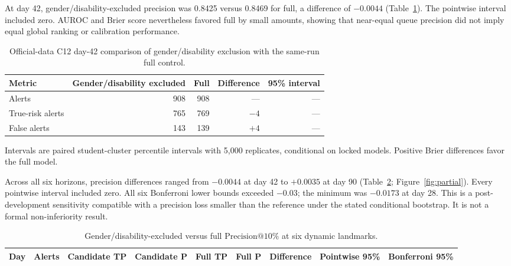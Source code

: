\documentclass[11pt]{article}
\makeatletter
\newcommand{\Pten}{\ensuremath{\mathrm{Precision}@10\%}}
\makeatother
\begin{document}
At day 42, gender/disability-excluded precision was 0.8425 versus 0.8469 for full, a difference of $-0.0044$ (Table~\ref{tab:day42}). The pointwise interval included zero. AUROC and Brier score nevertheless favored full by small amounts, showing that near-equal queue precision did not imply equal global ranking or calibration performance.

\begin{table}[htbp]
\centering
\caption{Official-data C12 day-42 comparison of gender/disability exclusion with the same-run full control.}
\label{tab:day42}
\begin{threeparttable}
\small
\begin{tabular}{lrrrr}
\toprule
Metric & Gender/disability excluded & Full & Difference & 95\% interval \\
\midrule
Alerts & 908 & 908 & --- & --- \\
True-risk alerts & 765 & 769 & $-4$ & --- \\
False alerts & 143 & 139 & $+4$ & --- \\

\end{tabular}
\begin{tablenotes}[flushleft]
\footnotesize
\item Intervals are paired student-cluster percentile intervals with 5,000 replicates, conditional on locked models. Positive Brier differences favor the full model.
\end{tablenotes}
\end{threeparttable}
\end{table}

Across all six horizons, precision differences ranged from $-0.0044$ at day 42 to $+0.0035$ at day 90 (Table~\ref{tab:landmarks}; Figure~\ref{fig:partial}). Every pointwise interval included zero. All six Bonferroni lower bounds exceeded $-0.03$; the minimum was $-0.0173$ at day 28. This is a post-development sensitivity compatible with a precision loss smaller than the reference under the stated conditional bootstrap. It is not a formal non-inferiority result.

\begin{table}[htbp]
\centering
\caption{Gender/disability-excluded versus full \Pten{} at six dynamic landmarks.}
\label{tab:landmarks}
\scriptsize
\setlength{\tabcolsep}{3.5pt}
\begin{tabular}{rrrrrrrrr}
\toprule
Day & Alerts & Candidate TP & Candidate P & Full TP & Full P & Difference & Pointwise 95\% & Bonferroni 95\% \\
\midrule

\end{tabular}
\end{table}
\end{document}
